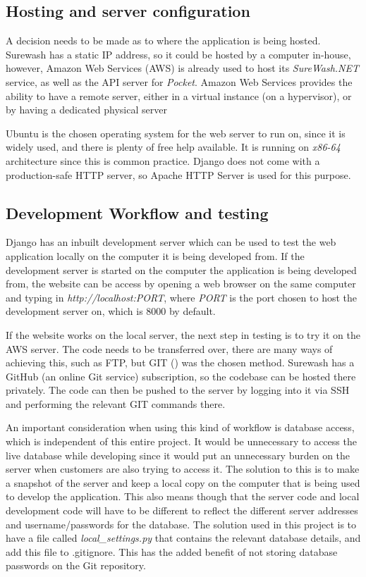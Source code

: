     \subsection{Hosting and server configuration}
    A decision needs to be made as to where the application is being hosted. Surewash has a static IP address, so it could be hosted by a computer in-house, however, Amazon Web Services (AWS) is already used to host its {\slshape SureWash.NET} service, as well as the API server for {\slshape Pocket}. Amazon Web Services provides the ability to have a remote server, either in a virtual instance (on a hypervisor), or by having a dedicated physical server

    Ubuntu is the chosen operating system for the web server to run on, since it is widely used, and there is plenty of free help available. It is running on {\slshape x86-64} architecture since this is common practice. Django does not come with a production-safe HTTP server, so Apache HTTP Server is used for this purpose.

    \subsection{Development Workflow and testing}
    Django has an inbuilt development server which can be used to test the web application locally on the computer it is being developed from. If the development server is started on the computer the application is being developed from, the website can be access by opening a web browser on the same computer and typing in {\slshape http://localhost:PORT}, where {\slshape PORT} is the port chosen to host the development server on, which is 8000 by default.

    If the website works on the local server, the next step in testing is to try it on the AWS server. The code needs to be transferred over, there are many ways of achieving this, such as FTP, but GIT (\cite{hamano2005git}) was the chosen method. Surewash has a GitHub (an online Git service) subscription, so the codebase can be hosted there privately. The code can then be pushed to the server by logging into it via SSH and performing the relevant GIT commands there.

    An important consideration when using this kind of workflow is database access, which is independent of this entire project. It would be unnecessary to access the live database while developing since it would put an unnecessary burden on the server when customers are also trying to access it. The solution to this is to make a snapshot of the server and keep a local copy on the computer that is being used to develop the application. This also means though that the server code and local development code will have to be different to reflect the different server addresses and username/passwords for the database. The solution used in this project is to have a file called {\slshape local\_settings.py} that contains the relevant database details, and add this file to .gitignore. This has the added benefit of not storing database passwords on the Git repository.

